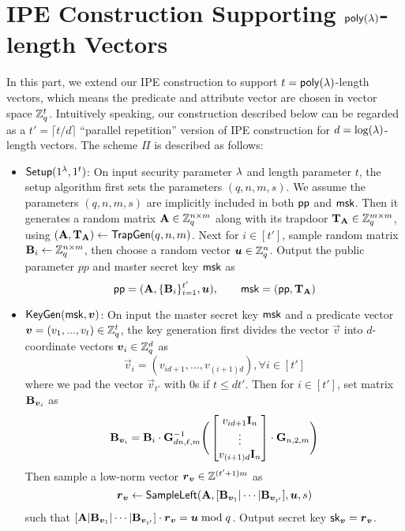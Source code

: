 \section{IPE Construction Supporting $\mathsf{poly}(\lambda)$-length Vectors} \label{sec:poly}
In this part, we extend our IPE construction to support $t = \mathsf{poly}(\lambda)$-length vectors, which means the predicate and attribute vector are chosen in vector space $\mathbb{Z}_q^t$. Intuitively speaking, our construction described below can be regarded as a $t' = \lceil t / d \rceil$ ``parallel repetition'' version of IPE construction for $d = \log(\lambda)$-length vectors. The scheme $\Pi$ is described as follows:
\begin{itemize}[leftmargin=*]
 \item $\mathsf{Setup}(1^\lambda, 1^t)$: On input security parameter $\lambda$ and length parameter $t$, the setup algorithm first sets the parameters $(q, n, m, s)$. We assume the parameters $(q, n, m, s)$ are implicitly included in both $\mathsf{pp}$ and $\mathsf{msk}$. Then it generates a random matrix $\mathbf{A} \in \mathbb{Z}_q^{n \times m}$ along with its trapdoor $\mathbf{T}_{\mathbf{A}} \in \mathbb{Z}_q^{m \times m}$, using $(\mathbf{A}, \mathbf{T}_{\mathbf{A}}) \leftarrow \mathsf{TrapGen}(q, n, m)$. Next for $i \in [t']$, sample random matrix $\mathbf{B}_i \leftarrow \mathbb{Z}_q^{n \times m}$, then choose a random vector $\boldsymbol{u} \in \mathbb{Z}_q^n$.  Output the public parameter $pp$ and master secret key $\mathsf{msk}$ as
  $$\mathsf{pp} = (\mathbf{A}, \{\mathbf{B}_i\}_{i = 1}^{t'}, \boldsymbol{u}), \qquad \mathsf{msk} = (\mathsf{pp}, \mathbf{T}_{\mathbf{A}})$$

 \item $\mathsf{KeyGen}(\mathsf{msk}, \boldsymbol{v})$: On input the master secret key $\mathsf{msk}$ and a predicate vector $\boldsymbol{v} = (v_1,..., v_t) \in \mathbb{Z}_q^t$, the key generation first divides the vector $\vec{v}$ into $d$-coordinate vectors $\boldsymbol{v}_i \in \mathbb{Z}_q^d$ as
 $$\vec{v}_i = (v_{id + 1},..., v_{(i + 1)d}), \forall i \in [t']$$
 where we pad the vector $\vec{v}_{t'}$ with 0s if $t \leq d t'$. Then for $i \in [t']$, set matrix $\mathbf{B}_{\boldsymbol{v}_i}$ as
 $$\mathbf{B}_{\boldsymbol{v}_i} = \mathbf{B}_i \cdot \mathbf{G}_{dn, \ell, m}^{-1}
 \Bigg(\begin{bmatrix}
v_{id + 1}\mathbf{I}_n \\
\vdots \\
v_{(i + 1)d}\mathbf{I}_n
\end{bmatrix} \cdot \mathbf{G}_{n, 2, m}\Bigg)$$
Then sample a low-norm vector $\boldsymbol{r}_{\boldsymbol{v}} \in \mathbb{Z}^{(t' + 1)m}$ as
$$\boldsymbol{r}_{\boldsymbol{v}} \leftarrow \mathsf{SampleLeft}(\mathbf{A}, [\mathbf{B}_{\boldsymbol{v}_1} | \cdots | \mathbf{B}_{\boldsymbol{v}_{t'}}], \boldsymbol{u}, s)$$
such that $[\mathbf{A} | \mathbf{B}_{\boldsymbol{v}_1} | \cdots | \mathbf{B}_{\boldsymbol{v}_{t'}}] \cdot \boldsymbol{r}_{\boldsymbol{v}} = \boldsymbol{u} \bmod q$. Output secret key $\mathsf{sk}_{\boldsymbol{v}} = \boldsymbol{r}_{\boldsymbol{v}}$.


\end{itemize}
